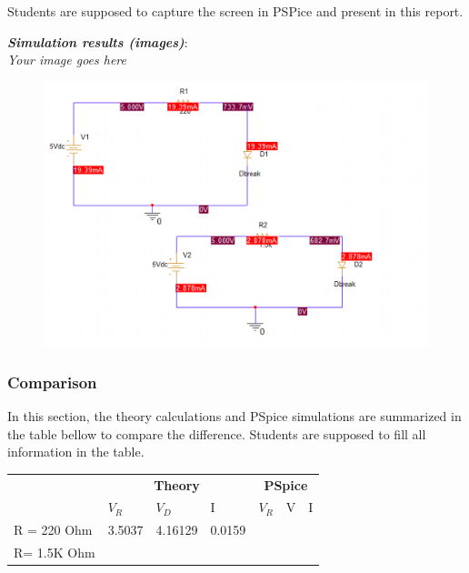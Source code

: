 Students are supposed to capture the screen in PSPice and present in this report.

\textit{\textbf{Simulation results (images)}}:\\ \textit{Your image goes here}
\begin{figure}[!htp]
    \centering
    \includegraphics[width = 500px]{source/picture/bai_2/sim_ex1.png}
\end{figure}
\newpage

\subsubsection{Comparison}
In this section, the theory calculations and PSpice simulations are summarized in the table bellow to compare the difference. Students are supposed to fill all information in the table.
\begin{center}
    \begin{tabular}{l|l|l|l|l|l|l|}
        \cline{2-7}
                                          & \multicolumn{3}{c|}{\textbf{Theory}} & \multicolumn{3}{c|}{\textbf{PSpice}}                          \\ \cline{2-7}
                                          & $V_R$                                & $V_D$                                & I      & $V_R$ & V & I \\ \hline
        \multicolumn{1}{|l|}{R = 220 Ohm} & 3.5037                               & 4.16129                              & 0.0159 &       &   &   \\ \hline
        \multicolumn{1}{|l|}{R= 1.5K Ohm} &                                      &                                      &        &       &   &   \\ \hline
    \end{tabular}
\end{center}


